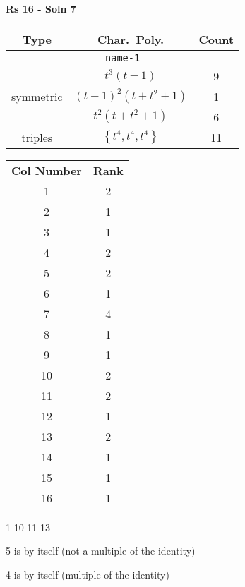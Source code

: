 \documentclass{article}
\begin{document}
    \textbf{Rs 16 - Soln 7}
    \begin{table}
    \begin{tabular}{|c|c|c|}
    \hline
    \textbf{Type} & \textbf{Char.~Poly.} & \textbf{Count} \\
    \hline \multicolumn{3}{|c|}{\texttt{name-1}} \\ \hline
    \multirow{3}{*}{symmetric}
    & $t^3(t - 1)$ & 9 \\
    & $(t - 1)^2(t + t^2 + 1)$ & 1 \\
    & $t^2(t + t^2 + 1)$ & 6 \\
    \hline
    \multirow{1}{*}{triples}
    & $\left\{t^4,t^4,t^4\right\}$ & 11 \\
    \hline
    \end{tabular}
    \end{table}
    \begin{table}
    \begin{tabular}{|c|c|}
    \hline
    \textbf{Col Number} & \textbf{Rank}\\
    1 & 2 \\ 
    2 & 1 \\ 
    3 & 1 \\ 
    4 & 2 \\ 
    5 & 2 \\ 
    6 & 1 \\ 
    7 & 4 \\ 
    8 & 1 \\ 
    9 & 1 \\ 
    10 & 2 \\ 
    11 & 2 \\ 
    12 & 1 \\ 
    13 & 2 \\ 
    14 & 1 \\ 
    15 & 1 \\ 
    16 & 1 \\ 
    \hline
    \end{tabular}
    \end{table}

    1 10 11 13

    5 is by itself (not a multiple of the identity)

    4 is by itself (multiple of the identity)
    \newpage
\end{document}
